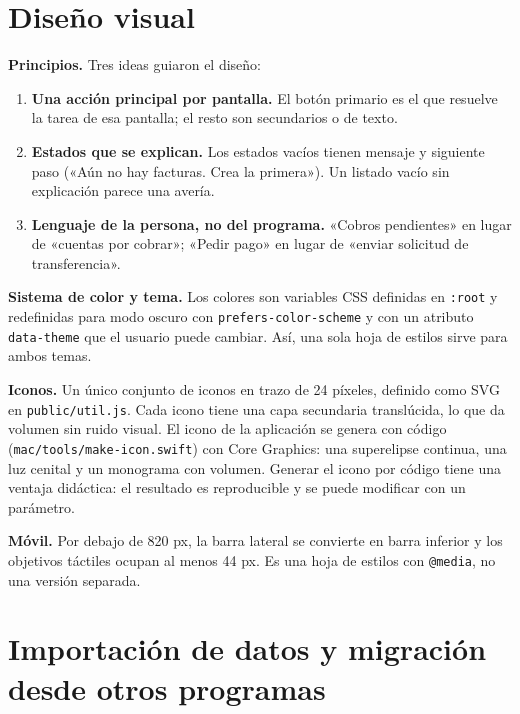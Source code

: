 \chapter{Diseño visual}\label{diseuxf1o-visual}

\textbf{Principios.} Tres ideas guiaron el diseño:

\begin{enumerate}
\def\labelenumi{\arabic{enumi}.}
\tightlist
\item
  \textbf{Una acción principal por pantalla.} El botón primario es el que resuelve la tarea de esa pantalla; el resto son secundarios o de texto.
\item
  \textbf{Estados que se explican.} Los estados vacíos tienen mensaje y siguiente paso («Aún no hay facturas. Crea la primera»). Un listado vacío sin explicación parece una avería.
\item
  \textbf{Lenguaje de la persona, no del programa.} «Cobros pendientes» en lugar de «cuentas por cobrar»; «Pedir pago» en lugar de «enviar solicitud de transferencia».
\end{enumerate}

\textbf{Sistema de color y tema.} Los colores son variables CSS definidas en \texttt{:root} y redefinidas para modo oscuro con \texttt{prefers-color-scheme} y con un atributo \texttt{data-theme} que el usuario puede cambiar. Así, una sola hoja de estilos sirve para ambos temas.

\textbf{Iconos.} Un único conjunto de iconos en trazo de 24 píxeles, definido como SVG en \texttt{public/util.js}. Cada icono tiene una capa secundaria translúcida, lo que da volumen sin ruido visual. El icono de la aplicación se genera con código (\texttt{mac/tools/make-icon.swift}) con Core Graphics: una superelipse continua, una luz cenital y un monograma con volumen. Generar el icono por código tiene una ventaja didáctica: el resultado es reproducible y se puede modificar con un parámetro.

\textbf{Móvil.} Por debajo de 820 px, la barra lateral se convierte en barra inferior y los objetivos táctiles ocupan al menos 44 px. Es una hoja de estilos con \texttt{@media}, no una versión separada.

\chapter{Importación de datos y migración desde otros programas}\label{cap:importacion}\label{importaciuxf3n-de-datos-y-migraciuxf3n-desde-otros-programas}

